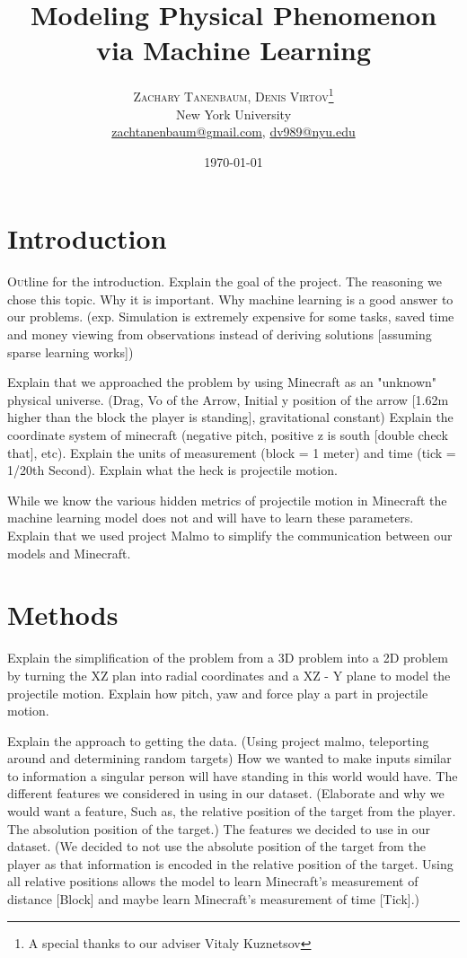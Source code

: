 \documentclass[twoside,twocolumn]{article}
\title{Modeling Physical Phenomenon via Machine Learning} %
\author{%
\textsc{Zachary Tanenbaum, Denis Virtov}\thanks{A special thanks to our adviser Vitaly Kuznetsov} \\[1ex] %
\normalsize New York University \\ %
\normalsize \href{mailto:zachtanenbaum@gmail.com}{zachtanenbaum@gmail.com}, \href{mailto:dv989@nyu.edu}{dv989@nyu.edu} %
}
\date{\today} %
\begin{document}
\maketitle


\section{Introduction}

\lettrine[nindent=0em,lines=3]{O}utline for the introduction.
Explain the goal of the project.
The reasoning we chose this topic.
Why it is important.
Why machine learning is a good answer to our problems.
(exp. Simulation is extremely expensive for some tasks, saved time and money viewing from observations instead of deriving solutions [assuming sparse learning works])

Explain that we approached the problem by using Minecraft as an "unknown" physical universe. (Drag, Vo of the Arrow, Initial y position of the arrow [1.62m higher than the block the player is standing], gravitational constant)
Explain the coordinate system of minecraft (negative pitch, positive z is south [double check that], etc).
Explain the units of measurement (block = 1 meter) and time (tick = 1/20th Second).
Explain what the heck is projectile motion.

While we know the various hidden metrics of projectile motion in Minecraft the machine learning model does not and will have to learn these parameters.
Explain that we used project Malmo to simplify the communication between our models and Minecraft.



\section{Methods}

Explain the simplification of the problem from a 3D problem into a 2D problem by turning the XZ plan into radial coordinates and a XZ - Y plane to model the projectile motion.
Explain how pitch, yaw and force play a part in projectile motion.

Explain the approach to getting the data. (Using project malmo, teleporting around and determining random targets)
How we wanted to make inputs similar to information a singular person will have standing in this world would have.
The different features we considered in using in our dataset. (Elaborate and why we would want a feature, Such as, the relative position of the target from the player. The absolution position of the target.)
The features we decided to use in our dataset. (We decided to not use the absolute position of the target from the player as that information is encoded in the relative position of the target. Using all relative positions allows the model to learn Minecraft's measurement of distance [Block] and maybe learn Minecraft's measurement of time [Tick].)
\end{document}

